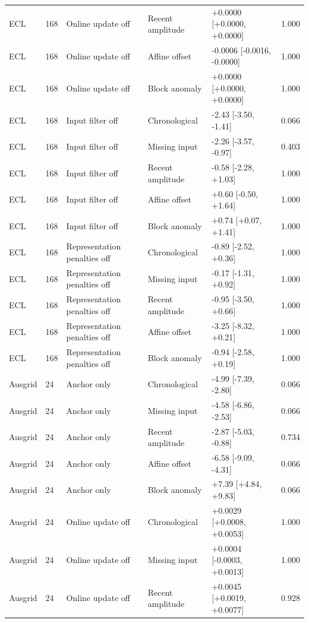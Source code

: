 {\begin{longtable}{lllp{2.5cm}p{4.1cm}r}
ECL & 168 & Online update off & Recent amplitude & +0.0000 [+0.0000, +0.0000] & 1.000 \\
ECL & 168 & Online update off & Affine offset & -0.0006 [-0.0016, -0.0000] & 1.000 \\
ECL & 168 & Online update off & Block anomaly & +0.0000 [+0.0000, +0.0000] & 1.000 \\
ECL & 168 & Input filter off & Chronological & -2.43 [-3.50, -1.41] & 0.066 \\
ECL & 168 & Input filter off & Missing input & -2.26 [-3.57, -0.97] & 0.403 \\
ECL & 168 & Input filter off & Recent amplitude & -0.58 [-2.28, +1.03] & 1.000 \\
ECL & 168 & Input filter off & Affine offset & +0.60 [-0.50, +1.64] & 1.000 \\
ECL & 168 & Input filter off & Block anomaly & +0.74 [+0.07, +1.41] & 1.000 \\
ECL & 168 & Representation penalties off & Chronological & -0.89 [-2.52, +0.36] & 1.000 \\
ECL & 168 & Representation penalties off & Missing input & -0.17 [-1.31, +0.92] & 1.000 \\
ECL & 168 & Representation penalties off & Recent amplitude & -0.95 [-3.50, +0.66] & 1.000 \\
ECL & 168 & Representation penalties off & Affine offset & -3.25 [-8.32, +0.21] & 1.000 \\
ECL & 168 & Representation penalties off & Block anomaly & -0.94 [-2.58, +0.19] & 1.000 \\
Ausgrid & 24 & Anchor only & Chronological & -4.99 [-7.39, -2.80] & 0.066 \\
Ausgrid & 24 & Anchor only & Missing input & -4.58 [-6.86, -2.53] & 0.066 \\
Ausgrid & 24 & Anchor only & Recent amplitude & -2.87 [-5.03, -0.88] & 0.734 \\
Ausgrid & 24 & Anchor only & Affine offset & -6.58 [-9.09, -4.31] & 0.066 \\
Ausgrid & 24 & Anchor only & Block anomaly & +7.39 [+4.84, +9.83] & 0.066 \\
Ausgrid & 24 & Online update off & Chronological & +0.0029 [+0.0008, +0.0053] & 1.000 \\
Ausgrid & 24 & Online update off & Missing input & +0.0004 [-0.0003, +0.0013] & 1.000 \\
Ausgrid & 24 & Online update off & Recent amplitude & +0.0045 [+0.0019, +0.0077] & 0.928 \\

\end{longtable}}
